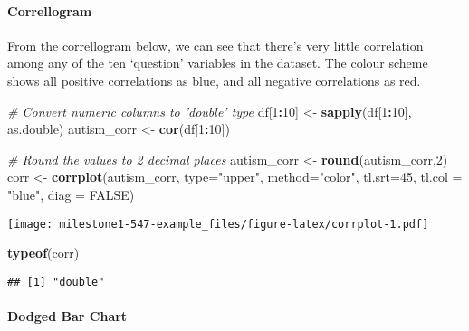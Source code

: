 \documentclass[]{article}
\newenvironment{Shaded}{\begin{snugshade}}{\end{snugshade}}
\newcommand{\CommentTok}[1]{\textcolor[rgb]{0.56,0.35,0.01}{\textit{#1}}}
\newcommand{\DataTypeTok}[1]{\textcolor[rgb]{0.13,0.29,0.53}{#1}}
\newcommand{\DecValTok}[1]{\textcolor[rgb]{0.00,0.00,0.81}{#1}}
\newcommand{\KeywordTok}[1]{\textcolor[rgb]{0.13,0.29,0.53}{\textbf{#1}}}
\newcommand{\NormalTok}[1]{#1}
\newcommand{\OperatorTok}[1]{\textcolor[rgb]{0.81,0.36,0.00}{\textbf{#1}}}
\newcommand{\OtherTok}[1]{\textcolor[rgb]{0.56,0.35,0.01}{#1}}
\newcommand{\StringTok}[1]{\textcolor[rgb]{0.31,0.60,0.02}{#1}}
\let\oldparagraph\paragraph
\renewcommand{\paragraph}[1]{\oldparagraph{#1}\mbox{}}
\begin{document}
\hypertarget{correllogram}{%
\paragraph{Correllogram}\label{correllogram}}

From the correllogram below, we can see that there's very little
correlation among any of the ten `question' variables in the dataset.
The colour scheme shows all positive correlations as blue, and all
negative correlations as red.

\begin{Shaded}
\begin{Highlighting}[]
\CommentTok{# Convert numeric columns to 'double' type}
\NormalTok{df[}\DecValTok{1}\OperatorTok{:}\DecValTok{10}\NormalTok{] <-}\StringTok{ }\KeywordTok{sapply}\NormalTok{(df[}\DecValTok{1}\OperatorTok{:}\DecValTok{10}\NormalTok{], as.double)}
\NormalTok{autism_corr <-}\StringTok{ }\KeywordTok{cor}\NormalTok{(df[}\DecValTok{1}\OperatorTok{:}\DecValTok{10}\NormalTok{])}

\CommentTok{# Round the values to 2 decimal places}
\NormalTok{autism_corr <-}\StringTok{ }\KeywordTok{round}\NormalTok{(autism_corr,}\DecValTok{2}\NormalTok{)}
\NormalTok{corr <-}\StringTok{ }\KeywordTok{corrplot}\NormalTok{(autism_corr, }
         \DataTypeTok{type=}\StringTok{"upper"}\NormalTok{, }
         \DataTypeTok{method=}\StringTok{"color"}\NormalTok{,}
         \DataTypeTok{tl.srt=}\DecValTok{45}\NormalTok{, }
         \DataTypeTok{tl.col =} \StringTok{"blue"}\NormalTok{,}
         \DataTypeTok{diag =} \OtherTok{FALSE}\NormalTok{)}
\end{Highlighting}
\end{Shaded}

\texttt{[image: milestone1-547-example\_files/figure-latex/corrplot-1.pdf]}

\begin{Shaded}
\begin{Highlighting}[]
\KeywordTok{typeof}\NormalTok{(corr)}
\end{Highlighting}
\end{Shaded}

\begin{verbatim}
## [1] "double"
\end{verbatim}

\hypertarget{dodged-bar-chart}{%
\paragraph{Dodged Bar Chart}\label{dodged-bar-chart}}
\end{document}
